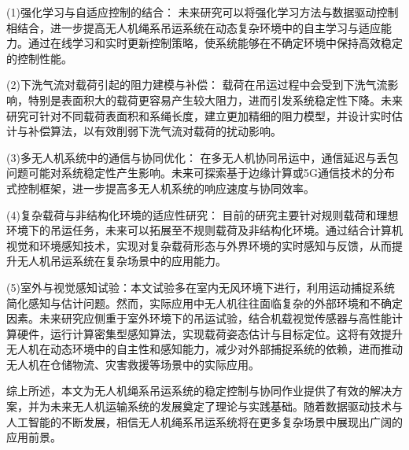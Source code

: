 \documentclass[lang=chs, degree=master, blindreview=false, winfonts=true]{yanputhesis}
\begin{document}
(1)强化学习与自适应控制的结合：
未来研究可以将强化学习方法与数据驱动控制相结合，进一步提高无人机绳系吊运系统在动态复杂环境中的自主学习与适应能力。通过在线学习和实时更新控制策略，使系统能够在不确定环境中保持高效稳定的控制性能。

(2)下洗气流对载荷引起的阻力建模与补偿：
载荷在吊运过程中会受到下洗气流影响，特别是表面积大的载荷更容易产生较大阻力，进而引发系统稳定性下降。未来研究可针对不同载荷表面积和系绳长度，建立更加精细的阻力模型，并设计实时估计与补偿算法，以有效削弱下洗气流对载荷的扰动影响。

(3)多无人机系统中的通信与协同优化：
在多无人机协同吊运中，通信延迟与丢包问题可能对系统稳定性产生影响。未来可探索基于边缘计算或5G通信技术的分布式控制框架，进一步提高多无人机系统的响应速度与协同效率。

(4)复杂载荷与非结构化环境的适应性研究：
目前的研究主要针对规则载荷和理想环境下的吊运任务，未来可以拓展至不规则载荷及非结构化环境。通过结合计算机视觉和环境感知技术，实现对复杂载荷形态与外界环境的实时感知与反馈，从而提升无人机吊运系统在复杂场景中的应用能力。

(5)室外与视觉感知试验：本文试验多在室内无风环境下进行，利用运动捕捉系统简化感知与估计问题。然而，实际应用中无人机往往面临复杂的外部环境和不确定因素。未来研究应侧重于室外环境下的吊运试验，结合机载视觉传感器与高性能计算硬件，运行计算密集型感知算法，实现载荷姿态估计与目标定位。这将有效提升无人机在动态环境中的自主性和感知能力，减少对外部捕捉系统的依赖，进而推动无人机在仓储物流、灾害救援等场景中的实际应用。

综上所述，本文为无人机绳系吊运系统的稳定控制与协同作业提供了有效的解决方案，并为未来无人机运输系统的发展奠定了理论与实践基础。随着数据驱动技术与人工智能的不断发展，相信无人机绳系吊运系统将在更多复杂场景中展现出广阔的应用前景。





\backmatter                                                 %
%
\end{document}
